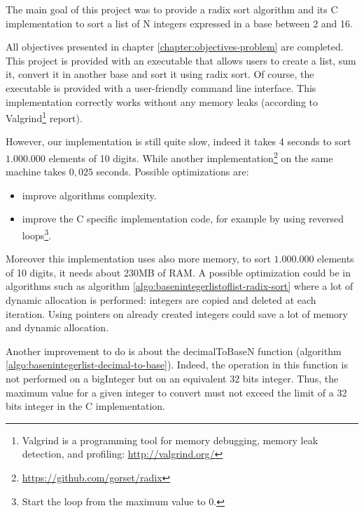 \documentclass[book, nodocumentinfo]{upmethodology-document}
\begin{document}
The main goal of this project was to provide a radix sort algorithm and its C implementation
to sort a list of N integers expressed in a base between 2 and 16.

All objectives presented in chapter \ref{chapter:objectives-problem} are completed.
This project is provided with an executable that allows users to create a list,
sum it, convert it in another base and sort it using radix sort.
Of course, the executable is provided with a user-friendly command line interface.
This implementation correctly works without any memory leaks
(according to Valgrind\footnote{Valgrind is a programming tool for memory debugging, memory leak detection, and profiling: \url{http://valgrind.org/}} report).

However, our implementation is still quite slow, indeed it takes 4 seconds to sort \(1.000.000\) elements of 10 digits.
While another implementation\footnote{\url{https://github.com/gorset/radix}} on the same machine takes \(0,025\) seconds.
Possible optimizations are:
\begin{itemize}
    \item improve algorithms complexity.
    \item improve the C specific implementation code, for example by using reversed loops\footnote{Start the loop from the maximum value to 0.}.
\end{itemize}

Moreover this implementation uses also more memory, to sort \(1.000.000\) elements of 10 digits, it needs about 230MB of RAM.
A possible optimization could be in algorithms such as algorithm \ref{algo:basenintegerlistoflist-radix-sort}
where a lot of dynamic allocation is performed: integers are copied and deleted at each iteration.
Using pointers on already created integers could save a lot of memory and dynamic allocation.

Another improvement to do is about the decimalToBaseN function (algorithm \ref{algo:basenintegerlist-decimal-to-base}).
Indeed, the operation in this function is not performed on a bigInteger but on an equivalent 32 bits integer.
Thus, the maximum value for a given integer to convert must not exceed the limit of a 32 bits integer in the C implementation.
\end{document}
